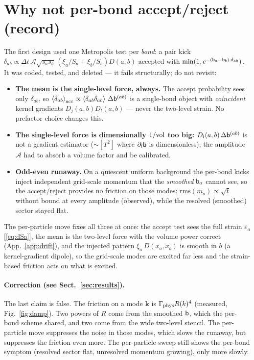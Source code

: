 \documentclass[12pt,aps,preprint,nofootinbib,noshowkeys,noshowpacs,longbibliography,superscriptaddress,tightenlines]{revtex4-2}
\def\bbeta{{\sf b}}
\def\llangle{\left\langle}
\def\rrangle{\right\rangle}
\def\app#1{App.~\ref{#1}}
\def\Fig#1{Fig.~\ref{#1}}
\def\Sect#1{Sect.~\ref{#1}}
\begin{document}
\section{Why not per-bond accept/reject (record)}
\label{app:perbond}

The first design used one Metropolis test per \emph{bond}: a pair kick
$\delta_{ab}\propto\Delta t\,\mathcal A\sqrt{s_as_b}\,(\xi_a/S_a+\xi_b/S_b)
D(a,b)$ accepted with $\min(1,e^{-(\bbeta_a-\bbeta_b)\cdot\delta_{ab}})$.  It
was coded, tested, and deleted --- it fails structurally; do not revisit:
\begin{itemize}
  \item \textbf{The mean is the single-level force, always.}  The accept
        probability sees only $\delta_{ab}$, so
        $\llangle\delta_{ab}\rrangle_{\rm acc}\propto
        \llangle\delta_{ab}\delta_{ab}\rrangle\,\Delta\bbeta^{(ab)}$ is a
        single-bond object with \emph{coincident} kernel gradients
        $D_j(a,b)D_l(a,b)$ --- never the two-level strain.  No prefactor
        choice changes this.
  \item \textbf{The single-level force is dimensionally $1/{\rm vol}$ too
        big:} $D_l(a,b)\,\Delta\bbeta^{(ab)}$ is not a gradient estimator
        ($\sim[T^2]$ where $\partial_l\bbeta$ is dimensionless); the
        amplitude $\mathcal A$ had to absorb a volume factor and be
        calibrated.
  \item \textbf{Odd-even runaway.}  On a quiescent uniform background the
        per-bond kicks inject independent grid-scale momentum that the
        \emph{smoothed} $\bbeta_a$ cannot see, so the accept/reject provides
        no friction on those modes: $\mathrm{rms}(m_a)\propto\sqrt{t}$
        without bound at every amplitude (observed), while the resolved
        (smoothed) sector stayed flat.
\end{itemize}
The per-particle move fixes all three at once: the accept test sees the full
strain $\varepsilon_a$ [\eqref{eq:dSa}], the mean is the two-level force with
the volume power correct (\app{app:drift}), and the injected pattern
$\xi_a\,D(x_a,x_b)$ is smooth in $b$ (a kernel-gradient dipole), so the
grid-scale modes are excited far less and the strain-based friction acts on
what is excited.

\paragraph{Correction (see \Sect{sec:results}).}
The last claim is false.  The friction on a mode $\mathbf k$ is
$\Gamma_{\rm phys}R(k)^4$ (measured, \Fig{fig:damp}).  Two powers of $R$ come
from the smoothed $\bbeta$, which the per-bond scheme shared, and two come from
the wide two-level stencil.  The per-particle move suppresses the noise in
those modes, which slows the runaway, but suppresses the friction even more.
The per-particle sweep still shows the per-bond symptom (resolved sector flat,
unresolved momentum growing), only more slowly.
\end{document}
